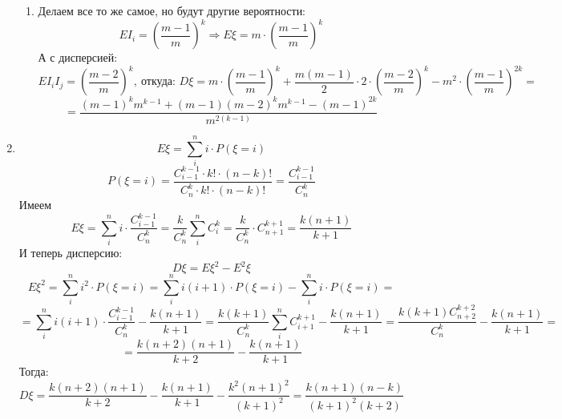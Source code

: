 \documentclass[11pt]{article}
\begin{document}
\begin{enumerate}
\begin{enumerate}
			\item Делаем все то же самое, но будут другие вероятности:
			$$EI_i=\left(\frac{m-1}{m}\right)^k\Rightarrow E\xi =m\cdot\left(\frac{m-1}{m}\right)^k$$
			А с дисперсией:
			$$EI_iI_j=\left(\frac{m-2}{m}\right)^k,\:\text{откуда: } D\xi =m\cdot \left(\frac{m-1}{m}\right)^k + \frac{m(m-1)}{2}\cdot 2\cdot \left(\frac{m-2}{m}\right)^k - m^2\cdot \left(\frac{m-1}{m}\right)^{2k}=$$
			$$=\frac{(m-1)^k m^{k-1} + (m-1)(m-2)^km^{k-1}-(m-1)^{2k}}{m^{2(k-1)}}$$
		\end{enumerate}
		\item $$E\xi = \sum_{i}^{n}i\cdot P(\xi = i)$$
		$$P(\xi=i)=\frac{C^{k-1}_{i-1}\cdot k!\cdot (n-k)!}{C^{k}_{n}\cdot k!\cdot (n-k)!}=\frac{C^{k-1}_{i-1}}{C^{k}_{n}}$$
		Имеем $$E\xi = \sum_{i}^{n}i\cdot \frac{C^{k-1}_{i-1}}{C^{k}_{n}}=\frac{k}{C^{k}_{n}}\sum_{i}^{n}C^k_i=\frac{k}{C^k_n}\cdot C^{k+1}_{n+1}=\frac{k(n+1)}{k+1}$$
		И теперь дисперсию: $$D\xi=E\xi^2-E^2\xi$$
		$$E\xi^2=\sum_{i}^{n}i^2\cdot P(\xi =i)=\sum_{i}^{n}i(i+1)\cdot P(\xi=i)-\sum_{i}^{n}i\cdot P(\xi=i)=$$
		$$=\sum_{i}^{n}i(i+1)\cdot \frac{C^{k-1}_{i-1}}{C^k_n}-\frac{k(n+1)}{k+1}=\frac{k(k+1)}{C^k_n}\sum_{i}^{n}C^{k+1}_{i+1}-\frac{k(n+1)}{k+1}=\frac{k(k+1)C^{k+2}_{n+2}}{C^k_n}-\frac{k(n+1)}{k+1}=$$
		$$=\frac{k(n+2)(n+1)}{k+2}-\frac{k(n+1)}{k+1}$$
		Тогда: $$D\xi=\frac{k(n+2)(n+1)}{k+2}-\frac{k(n+1)}{k+1}-\frac{k^2(n+1)^2}{(k+1)^2}=\frac{k(n+1)(n-k)}{(k+1)^2(k+2)}$$
	\end{enumerate}
\end{document}
